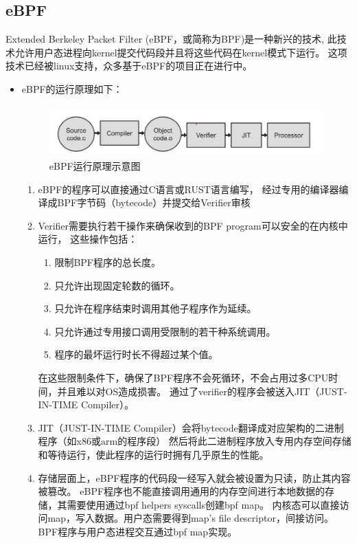 \documentclass[AutoFakeBold,a4paper]{ctexart}
\begin{document}

\subsection{eBPF}
    Extended Berkeley Packet Filter (eBPF，或简称为BPF)是一种新兴的技术,
    此技术允许用户态进程向kernel提交代码段并且将这些代码在kernel模式下运行。
    这项技术已经被linux支持，众多基于eBPF的项目正在进行中。

\begin{itemize}
    \item eBPF的运行原理如下\cite{vieira2020fast}：
    \begin{figure}[H]
        \centering
        \includegraphics[width=0.9\columnwidth]{../LvHongtao/pic_1.jpg}
        \caption{eBPF运行原理示意图}
    \end{figure}
    \begin{enumerate}
        \item eBPF的程序可以直接通过C语言或RUST语言编写，
        经过专用的编译器编译成BPF字节码（bytecode）并提交给Verifier审核
        \item Verifier需要执行若干操作来确保收到的BPF program可以安全的在内核中运行，
        这些操作包括：
        \begin{enumerate}
            \item 限制BPF程序的总长度。
            \item 只允许出现固定轮数的循环。
            \item 只允许在程序结束时调用其他子程序作为延续。
            \item 只允许通过专用接口调用受限制的若干种系统调用。
            \item 程序的最坏运行时长不得超过某个值。
        \end{enumerate}
        在这些限制条件下，确保了BPF程序不会死循环，不会占用过多CPU时间，并且难以对OS造成损害。
        通过了verifier的程序会被送入JIT（JUST-IN-TIME Compiler）。
        \item JIT（JUST-IN-TIME Compiler）会将bytecode翻译成对应架构的二进制程序（如x86或arm的程序段）
        然后将此二进制程序放入专用内存空间存储和等待运行，使此程序的运行时拥有几乎原生的性能。
        \item 存储层面上，eBPF程序的代码段一经写入就会被设置为只读，防止其内容被篡改。
        eBPF程序也不能直接调用通用的内存空间进行本地数据的存储，其需要使用通过bpf helpers syscalls创建bpf map。
        内核态可以直接访问map，写入数据。用户态需要得到map's file descriptor，间接访问。
        BPF程序与用户态进程交互通过bpf map实现。
        

\end{enumerate}
\end{itemize}
\end{document}
